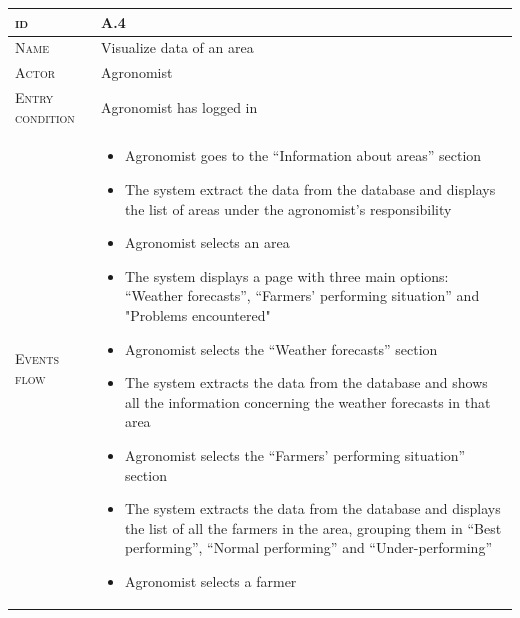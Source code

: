 \begin{table}[H]
    \centering
    \begin{tabular}[c]{|l|p{}|}
        \hline %
    	\textsc{id}                 &   A.4\\
    	\hline %
    	\textsc{Name}               &   Visualize data of an area\\
    	\hline %
    	\textsc{Actor}             &   Agronomist\\
    	\hline %
    	\textsc{Entry condition}   &   Agronomist has logged in\\
    	\hline %
    	\textsc{Events flow}         &   %
            	                        \begin{itemize}
                                    	    \item Agronomist goes to the “Information about areas” section
                                    	    \item The system extract the data from the database and displays the list of areas under the agronomist's responsibility
                                    	    \item Agronomist selects an area
                                    		\item The system displays a page with three main options: “Weather forecasts”, “Farmers’ performing situation” and "Problems encountered"
                                    		\item Agronomist selects  the “Weather forecasts” section
                                    		\item The system extracts the data from the database and shows all the information concerning the weather forecasts in that area
                                    		\item Agronomist selects the “Farmers’ performing situation” section
                                    		\item The system extracts the data from the database and displays the list of all the farmers in the area, grouping them in “Best performing”, “Normal performing” and “Under-performing”
                                    		\item Agronomist selects a farmer

\end{itemize}
\end{tabular}
\end{table}
